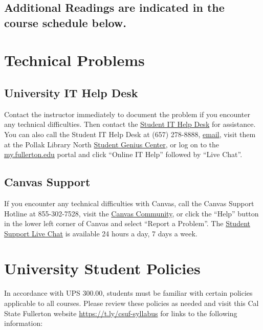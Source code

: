 \documentclass[12pt, letterpaper]{article}
\begin{document}
\subsection*{Additional Readings are indicated in the course schedule below.}

\section{Technical Problems}

\subsection*{University IT Help Desk}

Contact the instructor immediately to document the problem if you encounter any technical difficulties. Then contact the \href{http://www.fullerton.edu/it/students/helpdesk/index.php}{Student IT Help Desk} for assistance. You can also call the Student IT Help Desk at (657) 278-8888, \href{mailto:StudentITHelpDesk@fullerton.edu}{email}, visit them at the Pollak Library North \href{http://www.fullerton.edu/it/students/sgc/index.php}{Student Genius Center}, or log on to the \href{http://my.fullerton.edu/}{my.fullerton.edu} portal and click ``Online IT Help'' followed by ``Live Chat''.

\subsection*{Canvas Support}

If you encounter any technical difficulties with Canvas, call the Canvas Support Hotline at 855-302-7528, visit the \href{https://community.canvaslms.com/docs/DOC-10720-67952720329}{Canvas Community}, or click the ``Help'' button in the lower left corner of Canvas and select ``Report a Problem''. The \href{https://cases.canvaslms.com/liveagentchat?chattype=student&sfid=001A000000YzcwQIAR}{Student Support Live Chat} is available 24 hours a day, 7 days a week.


\section{University Student Policies}

In accordance with UPS 300.00, students must be familiar with certain policies applicable to all courses. Please review these policies as needed and visit this Cal State Fullerton website \href{https://t.ly/csuf-syllabus}{https://t.ly/csuf-syllabus} for links to the following information:
\end{document}
